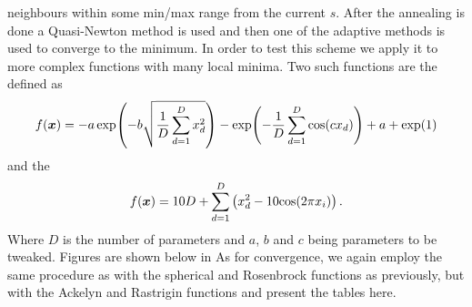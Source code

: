     neighbours within some min/max range from the current $s$\cite{simaneal}.
    After the annealing is done a Quasi-Newton method is used and then one of
    the adaptive methods is used to converge to the minimum. In order to test
    this scheme we apply it to more complex functions with many local minima.
    Two such functions are the \cite{simulationlib}
    defined as
        \begin{equation}
            f(\blds{x}) = -a\exp(-b\sqrt{\frac{1}{D}\suml{d=1}{D}x^2_d}) -
            \exp(-\frac{1}{D}\suml{d=1}{D}\text{cos}(cx_d)) + a + \exp(1)
        \end{equation}
    and the \cite{simulationlib}
        \begin{equation}
            f(\blds{x}) = 10D + \suml{d=1}{D}\left(x^2_d - 10\text{cos}(2\pi
            x_i)\right).
        \end{equation}
    Where $D$ is the number of parameters and $a$, $b$ and $c$ being parameters
    to be tweaked. Figures are shown below in 
    As for convergence, we again employ the same procedure as with the
    spherical and Rosenbrock functions as previously, but with the Ackelyn and
    Rastrigin functions and present the tables here.
